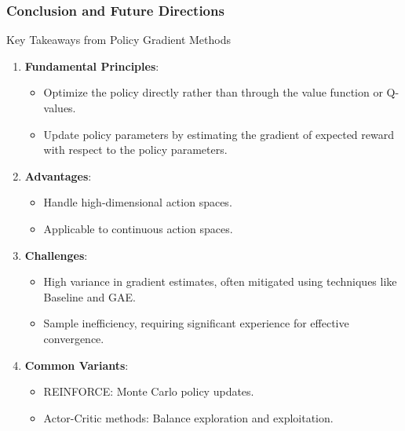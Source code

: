 \documentclass[aspectratio=169]{beamer}
\begin{document}
\begin{frame}[fragile]
    \frametitle{Conclusion and Future Directions}
    \begin{block}{Key Takeaways from Policy Gradient Methods}
        \begin{enumerate}
            \item \textbf{Fundamental Principles}:
                \begin{itemize}
                    \item Optimize the policy directly rather than through the value function or Q-values.
                    \item Update policy parameters by estimating the gradient of expected reward with respect to the policy parameters.
                \end{itemize}
            \item \textbf{Advantages}:
                \begin{itemize}
                    \item Handle high-dimensional action spaces.
                    \item Applicable to continuous action spaces.
                \end{itemize}
            \item \textbf{Challenges}:
                \begin{itemize}
                    \item High variance in gradient estimates, often mitigated using techniques like Baseline and GAE.
                    \item Sample inefficiency, requiring significant experience for effective convergence.
                \end{itemize}
            \item \textbf{Common Variants}:
                \begin{itemize}
                    \item REINFORCE: Monte Carlo policy updates.
                    \item Actor-Critic methods: Balance exploration and exploitation.
                \end{itemize}
        \end{enumerate}
    \end{block}
\end{frame}
\end{document}
